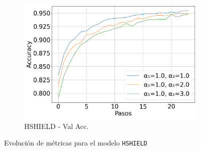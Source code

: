 \begin{figure}[H]
\begin{subfigure}[b]{0.3\textwidth}
        \includegraphics[width=\linewidth]{images/Val_Accuracy_evolucion_hshield.png}
        \caption{HSHIELD - Val Acc.}
    \end{subfigure}

    \caption{Evolución de métricas para el modelo \texttt{HSHIELD}}
    \label{fig:metrics_hshield}
\end{figure}

%
%
%

